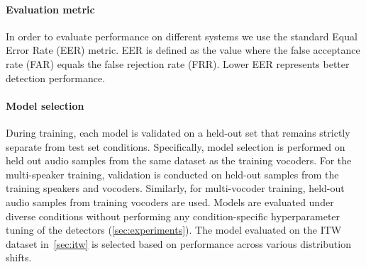 \paragraph{Evaluation metric}
In order to evaluate performance on different systems we use the standard Equal Error Rate (EER) metric. EER is defined as the value where the false acceptance rate (FAR) equals the false rejection rate (FRR). Lower EER represents better detection performance.

\paragraph{Model selection} 
During training, each model is validated on a held-out set that remains strictly separate from test set conditions. Specifically, model selection is performed on held out audio samples from the same dataset as the training vocoders. For the multi-speaker training, validation is conducted on held-out samples from the training speakers and vocoders. Similarly, for multi-vocoder training, held-out audio samples from training vocoders are used.
Models are evaluated under diverse conditions without performing any condition-specific hyperparameter tuning of the detectors (\autoref{sec:experiments}). The model evaluated on the ITW dataset in~\autoref{sec:itw} is selected  based on performance across various distribution shifts.
